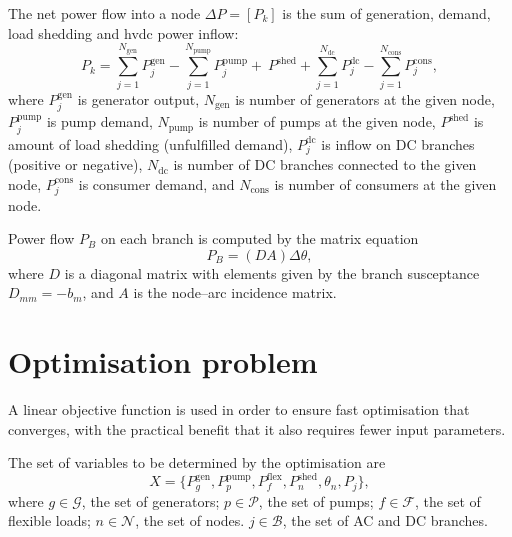 \documentclass{article}
\begin{document}
The net power flow into a node $\Delta P = [P_k]$ is the sum of generation, demand, load shedding and hvdc power inflow:
\begin{equation}
	P_k  = \sum_{j=1}^{N_\text{gen}} P_j^\text{gen}
			- \sum_{j=1}^{N_\text{pump}} P_j^\text{pump}
			+\ P^\text{shed}
			+\sum_{j=1}^{N_\text{dc}} P_j^\text{dc}
			-\sum_{j=1}^{N_\text{cons}} P_j^\text{cons},
\end{equation}
where
$P_j^\text{gen}$ is generator output,
$N_\text{gen}$ is number of generators at the given node,
$P_j^\text{pump}$ is pump demand,
$N_\text{pump}$ is number of pumps at the given node,
$P^\text{shed}$ is amount of load shedding (unfulfilled demand),
$P_j^\text{dc}$ is inflow on DC branches (positive or negative),
$N_\text{dc}$ is number of DC branches connected to the given node,
$P_j^\text{cons}$ is consumer demand,
and $N_\text{cons}$ is number of consumers at the given node.

Power flow $P_B$ on each branch is computed by the matrix equation
\begin{equation}
	P_B = (D A) \Delta\theta,
\end{equation}
where $D$ is a diagonal matrix with elements given by the branch susceptance $D_{mm} =-b_m$, and
$A$ is the node--arc incidence matrix.




\section{Optimisation problem}
\label{sec:linearoptimisation}

%
A linear objective function is used in order to ensure fast optimisation that converges, with the practical benefit that it also requires fewer input parameters.

%
The set of variables to be determined by the optimisation are
\begin{equation}
	\label{eq:variables}
	X = \{P_g^\text{gen}, P_p^\text{pump},P_f^\text{flex}, P_n^\text{shed}, \theta_n, P_j \},
\end{equation}
where 
$g\in \mathcal{G}$, the set of generators;
$p\in \mathcal{P}$, the set of pumps;
$f\in \mathcal{F}$, the set of flexible loads;
$n\in \mathcal{N}$, the set of nodes.
$j\in \mathcal{B}$, the set of AC and DC branches.
\end{document}
